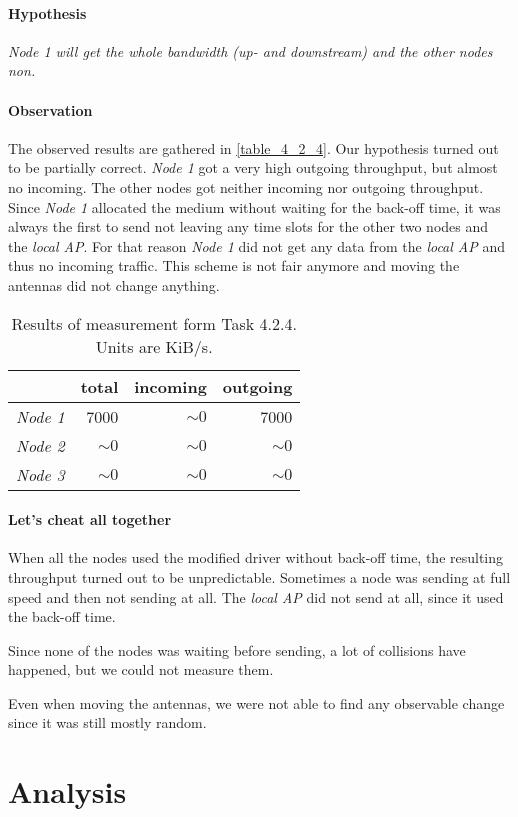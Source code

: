 \documentclass[12pt,a4paper]{article}
\begin{document}
\paragraph{Hypothesis}
\emph{Node 1 will get the whole bandwidth (up- and downstream) and the other nodes non.}

\paragraph{Observation}
The observed results are gathered in \autoref{table_4_2_4}.
Our hypothesis turned out to be partially correct.
\emph{Node 1} got a very high outgoing throughput, but almost no incoming.
The other nodes got neither incoming nor outgoing throughput.
Since \emph{Node 1} allocated the medium without waiting for the back-off time, it was always the first to send not leaving any time slots for the other two nodes and the \emph{local AP}. For that reason \emph{Node 1} did not get any data from the \emph{local AP} and thus no incoming traffic.
This scheme is not fair anymore and moving the antennas did not change anything.

\begin{table}
	\begin{center}
		\begin{tabular}{r|r|r|r}\
		 & total & incoming & outgoing \\
		 \hline 
		 \emph{Node 1} & 7000 & $\sim0$ & 7000 \\
		 \emph{Node 2} & $\sim0$ & $\sim0$ & $\sim0$ \\
		 \emph{Node 3} & $\sim0$ & $\sim0$ & $\sim0$ \\
		\end{tabular}
		
		\caption{Results of measurement form Task 4.2.4. Units are KiB/s.}
		\label{table_4_2_4}
	\end{center}
	\end{table}

\paragraph{Let's cheat all together}
When all the nodes used the modified driver without back-off time, the resulting throughput turned out to be unpredictable. Sometimes a node was sending at full speed and then not sending at all. The \emph{local AP} did not send at all, since it used the back-off time.

Since none of the nodes was waiting before sending, a lot of collisions have happened, but we could not measure them.

Even when moving the antennas, we were not able to find any observable change since it was still mostly random.
\section{Analysis}


\end{document}
